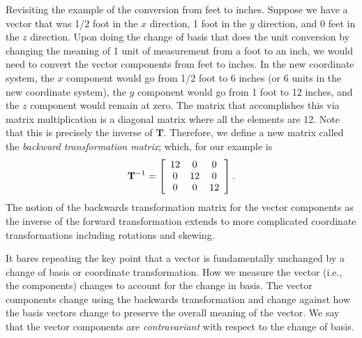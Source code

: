 Revisiting the example of the conversion from feet to inches. Suppose we have a vector that was 1/2 foot in the $x$ direction, 1 foot in the $y$ direction, and 0 feet in the $z$ direction. Upon doing the change of basis that does the unit conversion by changing the meaning of 1 unit of measurement from a foot to an inch, we would need to convert the vector components from feet to inches. In the new coordinate system, the $x$ component would go from 1/2 foot to 6 inches (or 6 units in the new coordinate system), the $y$ component would go from 1 foot to 12 inches, and the $z$ component would remain at zero. The matrix that accomplishes this via matrix multiplication is a diagonal matrix where all the elements are 12. Note that this is precisely the inverse of $\mathbf{T}$. Therefore, we define a new matrix called the \emph{backward transformation matrix}; which, for our example is
\begin{align}
  \mathbf{T}^{-1} = 
  \left[ \begin{array}{c c c} 12 & 0  & 0  \\
  						      0  & 12 & 0  \\
  						      0  & 0  & 12  \\ \end{array} \right] . \nonumber 
\end{align}
The notion of the backwards transformation matrix for the vector components as the inverse of the forward transformation extends to more complicated coordinate transformations including rotations and skewing.

It bares repeating the key point that a vector is fundamentally unchanged by a change of basis or coordinate transformation. How we measure the vector (i.e., the components) changes to account for the change in basis. The vector components change using the backwards transformation and change against how the basis vectors change to preserve the overall meaning of the vector. We say that the vector components are \emph{contravariant} with respect to the change of basis.

